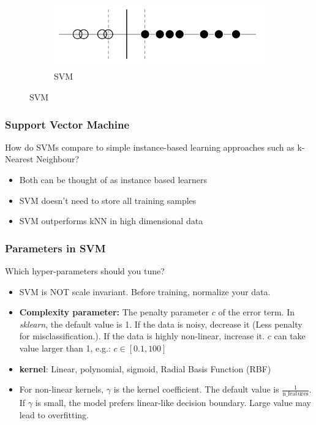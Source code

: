 \documentclass[aspectratio=169, 10pt]{beamer}
\begin{document}
\begin{frame}[t]
\begin{figure}
\begin{subfigure}[t]{0.30\linewidth}
        \end{subfigure}
        \begin{subfigure}[t]{0.30\linewidth}
            \captionsetup{justification=centering}
            \includegraphics[width=\linewidth]{../imgs/svm.png}
            \caption{SVM}
        \end{subfigure}
    \end{figure}

\end{frame}

\begin{frame}[t]
    \frametitle{Support Vector Machine}
    How do SVMs compare to simple instance-based learning approaches such as k-Nearest Neighbour?
    \pause

    \begin{itemize}
        \item Both can be thought of as instance based learners
        \item SVM doesn’t need to store all training samples
        \item SVM outperforms kNN in high dimensional data
    \end{itemize}

\end{frame}

\begin{frame}[t]
    \frametitle{Parameters in SVM}
    Which hyper-parameters should you tune?
    \pause

    \begin{itemize}
        \item SVM is NOT scale invariant. Before training, normalize your data.
        \item \textbf{Complexity parameter:} The penalty parameter $c$ of the error term. 
        In \textit{sklearn}, the default value is 1. If the data is noisy, decrease it (Less penalty for misclassification.). 
        If the data is highly non-linear, increase it. $c$ can take value larger than 1, e.g.: $c \in [0.1, 100]$
        \item \textbf{kernel}: Linear, polynomial, sigmoid, Radial Basis Function (RBF)
        \item For non-linear kernels, $\gamma$ is the kernel coefficient. The default value is $\frac{1}{\text{n\_features}}$.
        If $\gamma$ is small, the model prefers linear-like decision boundary. Large value may lead to overfitting.
    \end{itemize}

\end{frame}
\end{document}
